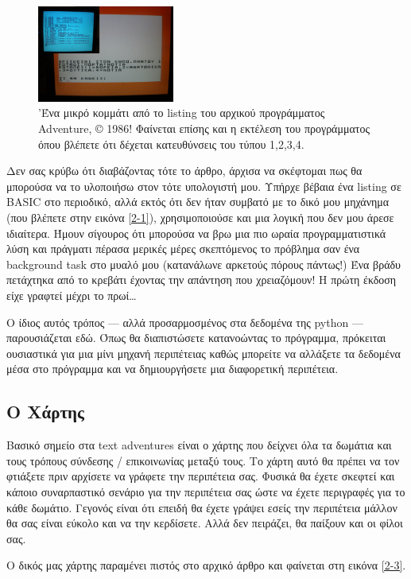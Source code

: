\begin{figure}
  \centering
  \includegraphics[width=0.4\textwidth]{images/chapter2/adventure-run2}
  \caption[Η Περιπέτεια, το αρχικό listing]{'Ένα μικρό κομμάτι από το listing του αρχικού προγράμματος Adventure, © 1986! Φαίνεται επίσης και η εκτέλεση του προγράμματος όπου βλέπετε ότι δέχεται κατευθύνσεις του τύπου 1,2,3,4.}
 \label{2-2}
\end{figure}

Δεν σας κρύβω ότι διαβάζοντας τότε το άρθρο, άρχισα να σκέφτομαι πως θα
μπορούσα να το υλοποιήσω στον τότε υπολογιστή μου. Υπήρχε βέβαια ένα listing
σε BASIC στο περιοδικό, αλλά εκτός ότι δεν ήταν συμβατό με το δικό μου
μηχάνημα (που βλέπετε στην εικόνα \ref{2-1}), χρησιμοποιούσε και μια λογική που δεν μου άρεσε ιδιαίτερα. Ήμουν σίγουρος ότι μπορούσα να βρω μια πιο ωραία
προγραμματιστικά λύση και πράγματι πέρασα μερικές μέρες σκεπτόμενος το
πρόβλημα σαν ένα background task στο μυαλό μου (κατανάλωνε αρκετούς πόρους
πάντως!) Ένα βράδυ πετάχτηκα από το κρεβάτι έχοντας την απάντηση που
χρειαζόμουν! Η πρώτη έκδοση είχε γραφτεί μέχρι το πρωί\ldots

Ο ίδιος αυτός τρόπος --- αλλά προσαρμοσμένος στα δεδομένα της python ---
παρουσιάζεται εδώ. Όπως θα διαπιστώσετε κατανοώντας το πρόγραμμα, πρόκειται
ουσιαστικά για μια μίνι μηχανή περιπέτειας καθώς μπορείτε να αλλάξετε τα
δεδομένα μέσα στο πρόγραμμα και να δημιουργήσετε μια διαφορετική περιπέτεια.
%
\subsection{Ο Χάρτης}
%
Βασικό σημείο στα text adventures είναι ο χάρτης που δείχνει όλα τα δωμάτια
και τους τρόπους σύνδεσης / επικοινωνίας μεταξύ τους. Το χάρτη αυτό θα
πρέπει να τον φτιάξετε πριν αρχίσετε να γράφετε την περιπέτεια σας. Φυσικά
θα έχετε σκεφτεί και κάποιο συναρπαστικό σενάριο για την περιπέτεια σας ώστε
να έχετε περιγραφές για το κάθε δωμάτιο. Γεγονός είναι ότι επειδή θα έχετε
γράψει εσείς την περιπέτεια μάλλον θα σας είναι εύκολο και να την κερδίσετε.
Αλλά δεν πειράζει, θα παίξουν και οι φίλοι σας.

Ο δικός μας χάρτης παραμένει πιστός στο αρχικό άρθρο και φαίνεται στη εικόνα
\ref{2-3}.

